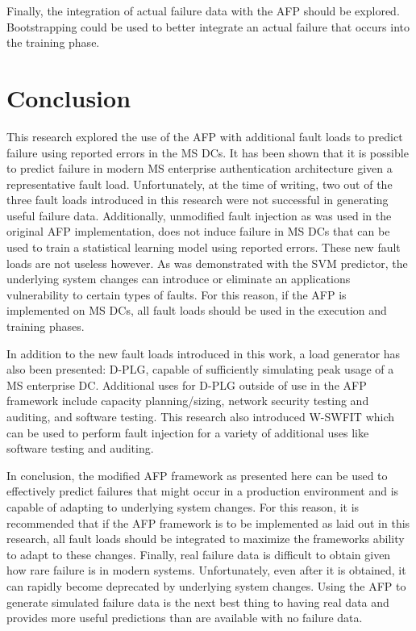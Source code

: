 Finally, the integration of actual failure data with the \ac{AFP} should be
explored.  Bootstrapping could be used to better integrate an actual failure
that occurs into the training phase. 

\section{Conclusion}
This research explored the use of the \ac{AFP} with additional fault loads to
predict failure using reported errors in the \ac{MS} \ac{DC}s.  It has been
shown that it is possible to predict failure in modern \ac{MS} enterprise
authentication architecture given a representative fault load.  Unfortunately,
at the time of writing, two out of the three fault loads introduced in this
research were not successful in generating useful failure data.  Additionally,
unmodified fault injection as was used in the original \ac{AFP} implementation,
does not induce failure in \ac{MS} \ac{DC}s that can be used to train a
statistical learning model using reported errors.  These new fault loads are
not useless however.  As was demonstrated with the \ac{SVM} predictor, the
underlying system changes can introduce or eliminate an applications
vulnerability to certain types of faults.  For this reason, if the \ac{AFP} is
implemented on \ac{MS} \ac{DC}s, all fault loads should be used in the
execution and training phases.

In addition to the new fault loads introduced in this work, a load generator
has also been presented:  \ac{D-PLG}, capable of sufficiently simulating peak
usage of a \ac{MS} enterprise \ac{DC}.  Additional uses for \ac{D-PLG} outside
of use in the \ac{AFP} framework include capacity planning/sizing, network
security testing and auditing, and software testing.  This research also
introduced \ac{W-SWFIT} which can be used to perform fault injection for a
variety of additional uses like software testing and auditing.

In conclusion, the modified \ac{AFP} framework as presented here can be used to
effectively predict failures that might occur in a production environment and
is capable of adapting to underlying system changes.  For this reason, it is
recommended that if the \ac{AFP} framework is to be implemented as laid out in
this research, all fault loads should be integrated to maximize the frameworks
ability to adapt to these changes.  Finally, real failure data is difficult to
obtain given how rare failure is in modern systems.  Unfortunately, even after
it is obtained, it can rapidly become deprecated by underlying system changes.
Using the \ac{AFP} to generate simulated failure data is the next best thing to
having real data and provides more useful predictions than are available with
no failure data.
